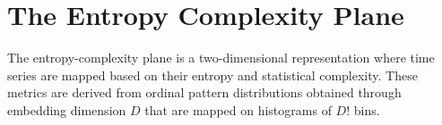 \section{The Entropy Complexity Plane} \label{Sec:EntropyComplexity}
The entropy-complexity plane is a two-dimensional representation where time series are mapped based on their entropy and statistical complexity. These metrics are derived from ordinal pattern distributions obtained through embedding dimension $D$ that are mapped on histograms of $D!$ bins. 


